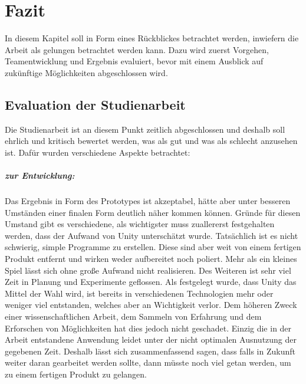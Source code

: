\chapter{Fazit}
\label{fazitChapter}
In diesem Kapitel soll in Form eines Rückblickes betrachtet werden, inwiefern die Arbeit als gelungen betrachtet werden kann. Dazu wird zuerst Vorgehen, Teamentwicklung und Ergebnis evaluiert, bevor mit einem Ausblick auf zukünftige Möglichkeiten abgeschlossen wird.

\section{Evaluation der Studienarbeit}

Die Studienarbeit ist an diesem Punkt zeitlich abgeschlossen und deshalb soll ehrlich und kritisch bewertet werden, was als gut und was als schlecht anzusehen ist. Dafür wurden verschiedene Aspekte betrachtet:

\paragraph{zur Entwicklung:} Das Ergebnis in Form des Prototypes ist akzeptabel, hätte aber unter besseren Umständen einer finalen Form deutlich näher kommen können. Gründe für diesen Umstand gibt es verschiedene, als wichtigster muss zuallererst festgehalten werden, dass der Aufwand von Unity unterschätzt wurde. Tatsächlich ist es nicht schwierig, simple Programme zu erstellen. Diese sind aber weit von einem fertigen Produkt entfernt und wirken weder aufbereitet noch poliert. Mehr als ein kleines Spiel lässt sich ohne große Aufwand nicht realisieren. Des Weiteren ist sehr viel Zeit in Planung und Experimente geflossen. Als festgelegt wurde, dass Unity das Mittel der Wahl wird, ist bereits in verschiedenen Technologien mehr oder weniger viel entstanden, welches aber an Wichtigkeit verlor. Dem höheren Zweck einer wissenschaftlichen Arbeit, dem Sammeln von Erfahrung und dem Erforschen von Möglichkeiten hat dies jedoch nicht geschadet. Einzig die in der Arbeit entstandene Anwendung leidet unter der nicht optimalen Ausnutzung der gegebenen Zeit. Deshalb lässt sich zusammenfassend sagen, dass falls in Zukunft weiter daran gearbeitet werden sollte, dann müsste noch viel getan werden, um zu einem fertigen Produkt zu gelangen. 


